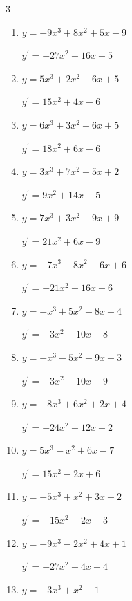 \begin{multicols}{3}
\begin{enumerate}
  \item $y=-9x^{3}+8x^{2}+5x-9$

        $\displaystyle y^{\prime}=-27x^{2}+16x+5$

  \item $y=5x^{3}+2x^{2}-6x+5$

        $\displaystyle y^{\prime}=15x^{2}+4x-6$

  \item $y=6x^{3}+3x^{2}-6x+5$

        $\displaystyle y^{\prime}=18x^{2}+6x-6$

  \item $y=3x^{3}+7x^{2}-5x+2$

        $\displaystyle y^{\prime}=9x^{2}+14x-5$

  \item $y=7x^{3}+3x^{2}-9x+9$

        $\displaystyle y^{\prime}=21x^{2}+6x-9$

  \item $y=-7x^{3}-8x^{2}-6x+6$

        $\displaystyle y^{\prime}=-21x^{2}-16x-6$

  \item $y=-x^{3}+5x^{2}-8x-4$

        $\displaystyle y^{\prime}=-3x^{2}+10x-8$

  \item $y=-x^{3}-5x^{2}-9x-3$

        $\displaystyle y^{\prime}=-3x^{2}-10x-9$

  \item $y=-8x^{3}+6x^{2}+2x+4$

        $\displaystyle y^{\prime}=-24x^{2}+12x+2$

  \item $y=5x^{3}-x^{2}+6x-7$

        $\displaystyle y^{\prime}=15x^{2}-2x+6$

  \item $y=-5x^{3}+x^{2}+3x+2$

        $\displaystyle y^{\prime}=-15x^{2}+2x+3$

  \item $y=-9x^{3}-2x^{2}+4x+1$

        $\displaystyle y^{\prime}=-27x^{2}-4x+4$

\columnbreak %

\resetques

  \item $y=-3x^{3}+x^{2}-1$


\end{enumerate}
\end{multicols}
